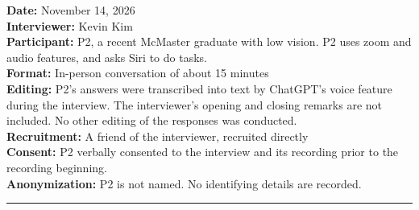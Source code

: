 
\textbf{Date:} November 14, 2026\\
\textbf{Interviewer:} Kevin Kim\\
\textbf{Participant:} P2, a recent McMaster graduate with low vision. P2 uses
zoom and audio features, and asks Siri to do tasks.\\
\textbf{Format:} In-person conversation of about 15 minutes\\
\textbf{Editing:} P2's answers were transcribed into text by ChatGPT's
voice feature during the interview. The interviewer's opening and
closing remarks are not included. No other editing of the responses
was conducted.\\
\textbf{Recruitment:} A friend of the interviewer, recruited directly\\
\textbf{Consent:} P2 verbally consented to the interview and its
recording prior to the recording beginning.\\
\textbf{Anonymization:} P2 is not named. No identifying details are
recorded.

\bigskip
\hrule
\bigskip

